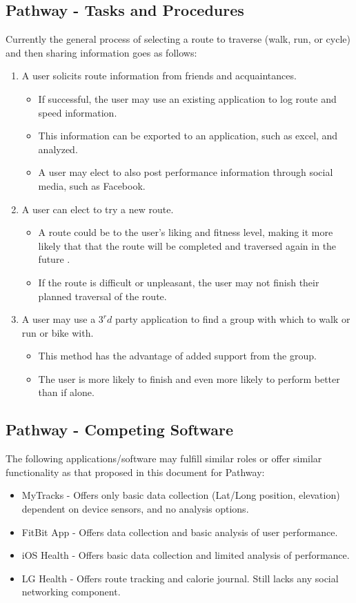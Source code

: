 \documentclass{article}
\begin{document}
\subsection{Pathway - Tasks and Procedures}
Currently the general process of selecting a route to traverse (walk, run, or cycle) and then sharing information goes as follows:
\begin{enumerate}
    \item A user solicits route information from friends and acquaintances.
        \begin{itemize}
            \item If successful, the user may use an existing application to log route and speed information.
            \item This information can be exported to an application, such as excel, and analyzed.
            \item A user may elect to also post performance information through social media, such as Facebook.
        \end{itemize}
    \item A user can elect to try a new route.
        \begin{itemize}
            \item A route could be to the user's liking and fitness level, making it more likely that that the route will be completed and traversed again in the future .
            \item If the route is difficult or unpleasant, the user may not finish their planned traversal of the route.
        \end{itemize}
    \item A user may use a $3^rd$ party application to find a group with which to walk or run or bike with.
        \begin{itemize}
            \item This method has the advantage of added support from the group.
            \item The user is more likely to finish and even more likely to perform better than if alone.
        \end{itemize}
\end{enumerate}

\subsection{Pathway - Competing Software}
The following applications/software may fulfill similar roles or offer similar functionality as that proposed in this document for Pathway:
\begin{itemize}
    \item MyTracks - Offers only basic data collection (Lat/Long position, elevation) dependent on device sensors, and no analysis options.
    \item FitBit App - Offers data collection and basic analysis of user performance.
    \item iOS Health - Offers basic data collection and limited analysis of performance.
    \item LG Health - Offers route tracking and calorie journal. Still lacks any social networking component.
\end{itemize}
\end{document}
